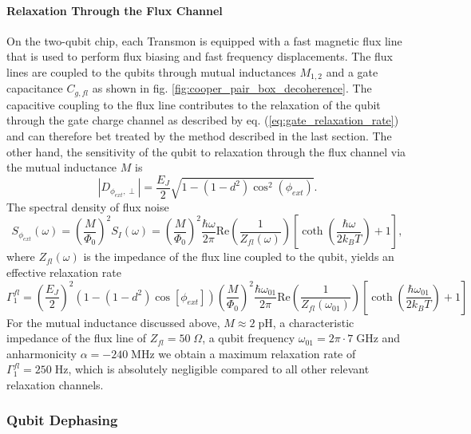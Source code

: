 \paragraph{Relaxation Through the Flux Channel}

On the two-qubit chip, each Transmon is equipped with a fast magnetic flux line that is used to perform flux biasing and fast frequency displacements. The flux lines are coupled to the qubits through mutual inductances $M_{1,2}$ and a gate capacitance $C_{g,fl}$ as shown in fig. \ref{fig:cooper_pair_box_decoherence}. The capacitive coupling to the flux line contributes to the relaxation of the qubit through the gate charge channel as described by eq. (\ref{eq:gate_relaxation_rate}) and can therefore bet treated by the method described in the last section. The other hand, the sensitivity of the qubit to relaxation through the flux channel via the mutual inductance $M$ is
%
\begin{equation}
\left|D_{\phi_{ext},\perp}\right|  = \frac{E_J}{2}\sqrt{1-(1-d^2)\cos^2{\left(\phi_{ext}\right)}}.
\end{equation}
%
The spectral density of flux noise
%
\begin{equation}
S_{\phi_{ext}}(\omega) = \left(\frac{M}{\Phi_0}\right)^2 S_I(\omega) = \left(\frac{M}{\Phi_0}\right)^2\frac{\hbar\omega}{2\pi}\mathrm{Re}\left(\frac{1}{Z_{fl}(\omega)}\right)\left[\coth{\left(\frac{\hbar\omega}{2k_B T}\right)}+1\right],
\end{equation}
%
where $Z_{fl}(\omega)$ is the impedance of the flux line coupled to the qubit, yields an effective relaxation rate
%
\begin{equation}
\Gamma_1^{fl}= \left(\frac{E_J}{2}\right)^2\left(1-(1-d^2)\cos{\left[\phi_{ext}\right]}\right)\left(\frac{M}{\Phi_0}\right)^2\frac{\hbar \omega_{01}}{2\pi}\mathrm{Re}\left(\frac{1}{Z_{fl}(\omega_{01})}\right)\left[\coth{\left(\frac{\hbar\omega_{01}}{2 k_B T}\right)}+1\right]
\end{equation}
%
For the mutual inductance discussed above, $M\approx 2\;\mathrm{pH}$, a characteristic impedance of the flux line of $Z_{fl}=50\;\Omega$, a qubit frequency $\omega_{01}=2\pi \cdot 7 \;\mathrm{GHz}$ and anharmonicity $\alpha=-240\;\mathrm{MHz}$ we obtain a maximum relaxation rate of $\Gamma_1^{fl}=250\;\mathrm{Hz}$, which is absolutely negligible compared to all other relevant relaxation channels.

\subsubsection{Qubit Dephasing}

